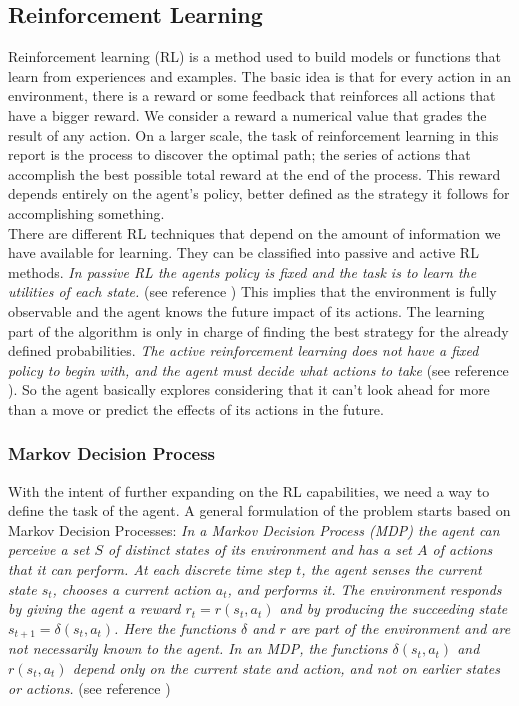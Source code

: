 \subsection*{Reinforcement Learning}

Reinforcement learning (RL) is a method used to build models or functions that learn from experiences and examples. The basic idea is that for every action in an environment, there is a reward or some feedback that reinforces all actions that have a bigger reward. We consider a reward a numerical value that grades the result of any action. On a larger scale, the task of reinforcement learning in this report is the process to discover the optimal path; the series of actions that accomplish the best possible total reward at the end of the process. This reward depends entirely on the agent's policy, better defined as the strategy it follows for accomplishing something. \\


There are different RL techniques that depend on the amount of information we have available for learning. They can be classified into passive and active RL methods. \textit{In passive RL the agents policy is fixed and the task is to learn the utilities of each state.} (see reference \cite[p764]{rl}) This implies that the environment is fully observable and the agent knows the future impact of its actions. The learning part of the algorithm is only in charge of finding the best strategy for the already defined probabilities. \textit{The active reinforcement learning does not have a fixed policy to begin with, and the agent must decide what actions to take}  (see reference \cite[p771]{rl}). So the agent basically explores considering that it can't look ahead for more than a move or predict the effects of its actions in the future.\\


\subsubsection{Markov Decision Process} \label{mdp}

With the intent of further expanding on the RL capabilities, we need a way to define the task of the agent. A general formulation of the problem starts based on Markov Decision Processes: \textit{In a Markov Decision Process (MDP) the agent can perceive a set $S$ of distinct states of its environment and has a set $A$ of actions that it can perform. At each discrete time step $t$, the agent senses the current state $s_t$, chooses a current action $a_t$, and performs it. The environment responds by giving the agent a reward $r_t = r(s_t,a_t)$ and by producing the succeeding state $s_{t+1}= \delta (s_t,a_t)$. Here the functions $\delta$ and $r$ are part of the environment and are not necessarily known to the agent. In an MDP, the functions $\delta (s_t,a_t)$ and $r(s_t,a_t)$ depend only on the current state and action, and not on earlier states or actions.} (see reference \cite[p370]{ml_tom_mitchel}) \\


